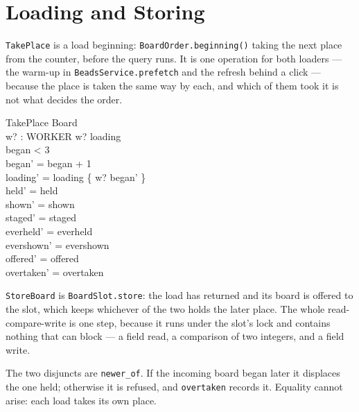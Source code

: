 \documentclass[a4paper,10pt,fleqn]{article}
\begin{document}
\section{Loading and Storing}

\texttt{TakePlace} is a load beginning: \texttt{BoardOrder.beginning()} taking
the next place from the counter, before the query runs. It is one operation for
both loaders --- the warm-up in \texttt{BeadsService.prefetch} and the refresh
behind a click --- because the place is taken the same way by each, and which of
them took it is not what decides the order.

\begin{schema}{TakePlace}
  \Delta Board \\
  w? : WORKER
\where
  w? \notin \dom loading \\
  began < 3 \\
  began' = began + 1 \\
  loading' = loading \cup \{ w? \mapsto began' \} \\
  held' = held \\
  shown' = shown \\
  staged' = staged \\
  everheld' = everheld \\
  evershown' = evershown \\
  offered' = offered \\
  overtaken' = overtaken
\end{schema}

\texttt{StoreBoard} is \texttt{BoardSlot.store}: the load has returned and its
board is offered to the slot, which keeps whichever of the two holds the later
place. The whole read-compare-write is one step, because it runs under the
slot's lock and contains nothing that can block --- a field read, a comparison
of two integers, and a field write.

The two disjuncts are \texttt{newer\_of}. If the incoming board began later it
displaces the one held; otherwise it is refused, and \texttt{overtaken} records
it. Equality cannot arise: each load takes its own place.
\end{document}
